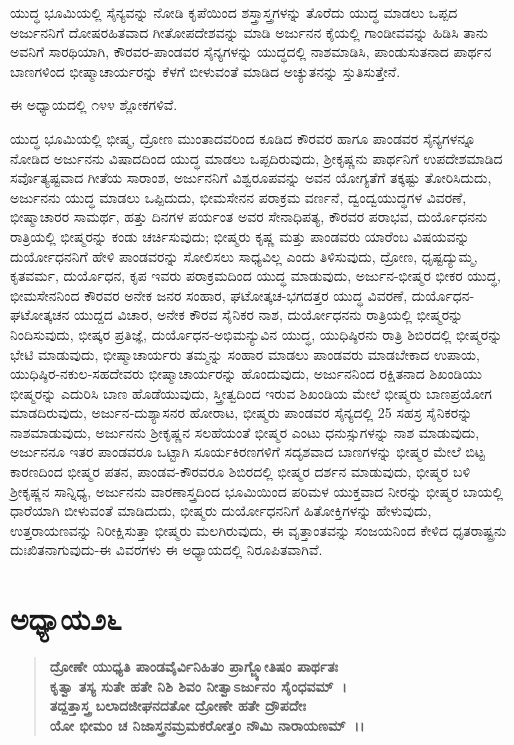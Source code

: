 ಯುದ್ಧ ಭೂಮಿಯಲ್ಲಿ ಸೈನ್ಯವನ್ನು ನೋಡಿ ಕೃಪೆಯಿಂದ ಶಸ್ತ್ರಾಸ್ತ್ರಗಳನ್ನು ತೊರೆದು ಯುದ್ಧ ಮಾಡಲು ಒಪ್ಪದ ಅರ್ಜುನನಿಗೆ ದೋಷರಹಿತವಾದ ಗೀತೋಪದೇಶವನ್ನು ಮಾಡಿ ಅರ್ಜುನನ ಕೈಯಲ್ಲಿ ಗಾಂಡೀವವನ್ನು ಹಿಡಿಸಿ ತಾನು ಅವನಿಗೆ ಸಾರಥಿಯಾಗಿ, ಕೌರವರ-\-ಪಾಂಡವರ ಸೈನ್ಯಗಳನ್ನು ಯುದ್ಧದಲ್ಲಿ ನಾಶಮಾಡಿಸಿ, ಪಾಂಡುಸುತನಾದ ಪಾರ್ಥನ ಬಾಣಗಳಿಂದ ಭೀಷ್ಮಾಚಾರ್ಯರನ್ನು ಕೆಳಗೆ ಬೀಳುವಂತೆ ಮಾಡಿದ ಅಚ್ಯುತನನ್ನು ಸ್ತುತಿಸುತ್ತೇನೆ.

ಈ ಅಧ್ಯಾಯದಲ್ಲಿ ೧೪೪ ಶ್ಲೋಕಗಳಿವೆ.

ಯುದ್ಧ ಭೂಮಿಯಲ್ಲಿ ಭೀಷ್ಮ, ದ್ರೋಣ ಮುಂತಾದವರಿಂದ ಕೂಡಿದ ಕೌರವರ ಹಾಗೂ ಪಾಂಡವರ ಸೈನ್ಯಗಳನ್ನೂ ನೋಡಿದ ಅರ್ಜುನನು ವಿಷಾದದಿಂದ ಯುದ್ಧ ಮಾಡಲು ಒಪ್ಪದಿರುವುದು, ಶ‍್ರೀಕೃಷ್ಣನು ಪಾರ್ಥನಿಗೆ ಉಪದೇಶಮಾಡಿದ ಸರ್ವೊತ್ಯಷ್ಟವಾದ ಗೀತೆಯ ಸಾರಾಂಶ, ಅರ್ಜುನನಿಗೆ ವಿಶ್ವರೂಪವನ್ನು ಅವನ ಯೋಗ್ಯತೆಗೆ ತಕ್ಕಷ್ಟು ತೋರಿಸಿದುದು, ಅರ್ಜುನನು ಯುದ್ಧ ಮಾಡಲು ಒಪ್ಪಿದುದು, ಭೀಮಸೇನನ ಪರಾಕ್ರಮ ವರ್ಣನೆ, ದ್ವಂದ್ವಯುದ್ಧಗಳ ವಿವರಣೆ, ಭೀಷ್ಮಾಚಾರರ ಸಾಮರ್ಥ, ಹತ್ತು ದಿನಗಳ ಪರ್ಯಂತ ಅವರ ಸೇನಾಧಿಪತ್ಯ, ಕೌರವರ ಪರಾಭವ, ದುರ್ಯೊಧನನು ರಾತ್ರಿಯಲ್ಲಿ ಭೀಷ್ಮರನ್ನು ಕಂಡು ಚರ್ಚಿಸುವುದು; ಭೀಷ್ಮರು ಕೃಷ್ಣ ಮತ್ತು ಪಾಂಡವರು ಯಾರೆಂಬ ವಿಷಯವನ್ನು ದುರ್ಯೋಧನನಿಗೆ ಹೇಳಿ ಪಾಂಡವರನ್ನು ಸೋಲಿಸಲು ಸಾಧ್ಯವಿಲ್ಲ ಎಂದು ತಿಳಿಸುವುದು, ದ್ರೋಣ, ಧೃಷ್ಟದ್ಯುಮ್ಮ, ಕೃತವರ್ಮ, ದುರ್ಯೊಧನ, ಕೃಪ ಇವರು ಪರಾಕ್ರಮದಿಂದ ಯುದ್ಧ ಮಾಡುವುದು, ಅರ್ಜುನ-\-ಭೀಷ್ಮರ ಭೀಕರ ಯುದ್ಧ, ಭೀಮಸೇನನಿಂದ ಕೌರವರ ಅನೇಕ ಜನರ ಸಂಹಾರ, ಘಟೋ\-ತ್ಕಚ-ಭಗದತ್ತರ ಯುದ್ಧ ವಿವರಣೆ, ದುರ್ಯೊಧನ-ಘಟೋತ್ಕಚನ ಯುದ್ದದ ವಿಚಾರ, ಅನೇಕ ಕೌರವ ಸೈನಿಕರ ನಾಶ, ದುರ್ಯೋಧನನು ರಾತ್ರಿಯಲ್ಲಿ ಭೀಷ್ಮರನ್ನು ನಿಂದಿಸುವುದು, ಭೀಷ್ಕರ ಪ್ರತಿಜ್ಞೆ, ದುರ್ಯೊಧನ-ಅಭಿಮನ್ಯುವಿನ ಯುದ್ಧ, ಯುಧಿಷ್ಠಿರನು ರಾತ್ರಿ ಶಿಬಿರದಲ್ಲಿ ಭೀಷ್ಮರನ್ನು ಭೇಟಿ ಮಾಡುವುದು, ಭೀಷ್ಮಾಚಾರ್ಯರು ತಮ್ಮನ್ನು ಸಂಹಾರ ಮಾಡಲು ಪಾಂಡವರು ಮಾಡಬೇಕಾದ ಉಪಾಯ, ಯುಧಿಷ್ಠಿರ-ನಕುಲ-ಸಹದೇವರು ಭೀಷ್ಮಾಚಾರ್ಯರನ್ನು ಹೊಂದುವುದು, ಅರ್ಜುನನಿಂದ ರಕ್ಷಿತನಾದ ಶಿಖಂಡಿಯು ಭೀಷ್ಮರನ್ನು ಎದುರಿಸಿ ಬಾಣ ಹೊಡೆಯುವುದು, ಸ್ತ್ರೀತ್ವದಿಂದ ಇರುವ ಶಿಖಂಡಿಯ ಮೇಲೆ ಭೀಷ್ಮರು ಬಾಣಪ್ರಯೋಗ ಮಾಡದಿರುವುದು, ಅರ್ಜುನ-ದುಶ್ಯಾಸನರ ಹೋರಾಟ, ಭೀಷ್ಮರು ಪಾಂಡವರ ಸೈನ್ಯದಲ್ಲಿ 25 ಸಹಸ್ರ ಸೈನಿಕರನ್ನು ನಾಶಮಾಡುವುದು, ಅರ್ಜುನನು ಶ‍್ರೀಕೃಷ್ಣನ ಸಲಹೆಯಂತೆ ಭೀಷ್ಮರ ಎಂಟು ಧನುಸ್ಸುಗಳನ್ನು ನಾಶ ಮಾಡುವುದು, ಅರ್ಜುನನೂ ಇತರ ಪಾಂಡವರೂ ಒಟ್ಟಾಗಿ ಸೂರ್ಯಕಿರಣಗಳಿಗೆ ಸದೃಶವಾದ ಬಾಣಗಳನ್ನು ಭೀಷ್ಮರ ಮೇಲೆ ಬಿಟ್ಟ ಕಾರಣದಿಂದ ಭೀಷ್ಮರ ಪತನ, ಪಾಂಡವ-ಕೌರವರೂ ಶಿಬಿರದಲ್ಲಿ ಭೀಷ್ಮರ ದರ್ಶನ ಮಾಡುವುದು, ಭೀಷ್ಮರ ಬಳಿ ಶ‍್ರೀಕೃಷ್ಣನ ಸಾನ್ನಿಧ್ಯ, ಅರ್ಜುನನು ವಾರಣಾಸ್ತ್ರದಿಂದ ಭೂಮಿಯಿಂದ ಪರಿಮಳ ಯುಕ್ತವಾದ ನೀರನ್ನು ಭೀಷ್ಮರ ಬಾಯಲ್ಲಿ ಧಾರೆಯಾಗಿ ಬೀಳುವಂತೆ ಮಾಡಿದುದು, ಭೀಷ್ಮರು ದುರ್ಯೋಧನನಿಗೆ ಹಿತೋಕ್ತಿಗಳನ್ನು ಹೇಳುವುದು, ಉತ್ತರಾಯಣವನ್ನು ನಿರೀಕ್ಷಿಸುತ್ತಾ ಭೀಷ್ಮರು ಮಲಗಿರುವುದು, ಈ ವೃತ್ತಾಂತವನ್ನು ಸಂಜಯನಿಂದ ಕೇಳಿದ ಧೃತರಾಷ್ಟ್ರನು ದುಃಖಿತನಾಗುವುದು-ಈ ವಿವರಗಳು ಈ ಅಧ್ಯಾಯದಲ್ಲಿ ನಿರೂಪಿತವಾಗಿವೆ.


\section*{ಅಧ್ಯಾಯ\enginline{-}೨೬}

\begin{verse}
\textbf{ದ್ರೋಣೇ ಯುಧ್ಯತಿ ಪಾಂಡವೈರ್ವಿನಿಹಿತಂ ಪ್ರಾಗ್ಜ್ಯೋತಿಷಂ ಪಾರ್ಥತಃ}\\\textbf{ಕೃತ್ವಾ ತಸ್ಯ ಸುತೇ ಹತೇ ನಿಶಿ ಶಿವಂ ನೀತ್ವಾಽರ್ಜುನಂ ಸೈಂಧವಮ್~।}\\\textbf{ತದ್ದತ್ತಾಸ್ತ್ರ ಬಲಾದಜೀಘನದತೋ ದ್ರೋಣೇ ಹತೇ ದ್ರೌಪದೇಃ}\\\textbf{ಯೋ ಭೀಮಂ ಚ ನಿಜಾಸ್ತ್ರನಮ್ರಮಕರೋತ್ತಂ ನೌಮಿ ನಾರಾಯಣಮ್~।।}
\end{verse}

